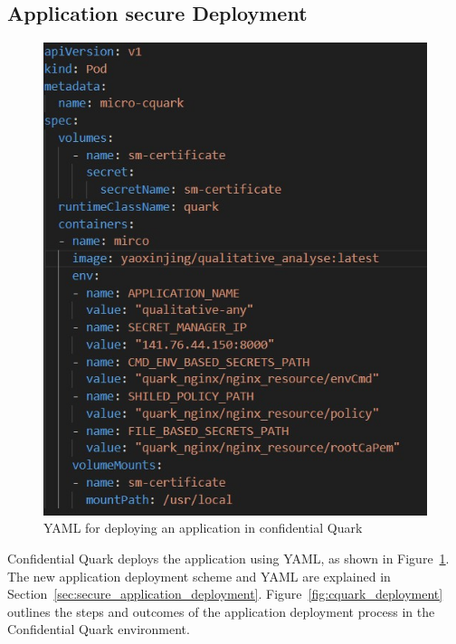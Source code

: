 \subsection{Application secure Deployment}
\begin{figure}[!htb]
    \centering
    \includegraphics[height=0.3\textheight]{images/cquark_deploy_yaml.jpg}
    \caption[YAML for deploying an application in confidential Quark]{YAML for deploying an application in confidential Quark}
    \label{fig:cquark_deploy_yaml}
\end{figure}

Confidential Quark deploys the application using YAML, as shown in Figure~\ref{fig:cquark_deploy_yaml}. The new application deployment scheme and YAML are explained in Section~\ref{sec:secure_application_deployment}. Figure~\ref{fig:cquark_deployment} outlines the steps and outcomes of the application deployment process in the Confidential Quark environment.

